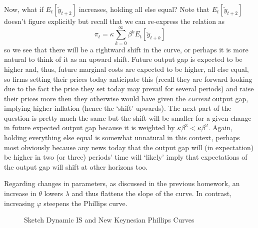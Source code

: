 \documentclass[authoryear,11pt]{elsarticle}
\begin{document}
Now, what if $E_{t}[\tilde{y}_{t+2}]$ increases, holding all else equal? Note that $E_{t}[\tilde{y}_{t+2}]$ doesn't figure explicitly but recall that we can re-express the relation as
\[
\pi_{t} = \kappa \sum\limits_{k=0}^{\infty} \beta^{k} E_{t}[ \tilde{y}_{t+k} ]
\]
so we see that there will be a rightward shift in the curve, or perhaps it is more natural to think of it as an upward shift. Future output gap is expected to be higher and, thus, future marginal costs are expected to be higher, all else equal, so firms setting their prices today anticipate this (recall they are forward looking due to the fact the price they set today may prevail for several periods) and raise their prices more then they otherwise would have given the \emph{current} output gap, implying higher inflation (hence the `shift' upwards). The next part of the question is pretty much the same but the shift will be smaller for a given change in future expected output gap because it is weighted by $\kappa \beta^{3} < \kappa \beta^{2}$. Again, holding everything else equal is somewhat unnatural in this context, perhaps most obviously because any news today that the output gap will (in expectation) be higher in two (or three) periods' time will `likely' imply that expectations of the output gap will shift at other horizons too.

Regarding changes in parameters, as discussed in the previous homework, an increase in $\theta$ lowers $\lambda$ and thus flattens the slope of the curve. In contrast, increasing $\varphi$ steepens the Phillips curve.

\begin{figure}[!htb]
\caption{\label{fig:dis_nkpc} Sketch Dynamic IS and New Keynesian Phillips Curves}
\end{figure}
\end{document}
